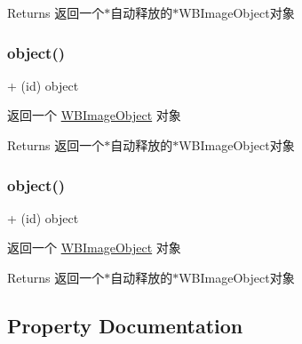 \begin{DoxyReturn}{Returns}
返回一个$\ast$自动释放的$\ast$\+W\+B\+Image\+Object对象 
\end{DoxyReturn}
\mbox{\label{interface_w_b_image_object_abbfcbcca8af541d7f42fe670df3507cc}} 
\subsubsection{\texorpdfstring{object()}{object()}\hspace{0.1cm}{\footnotesize\ttfamily [2/3]}}
{\footnotesize\ttfamily + (id) object \begin{DoxyParamCaption}{ }\end{DoxyParamCaption}}

返回一个 \mbox{\hyperlink{interface_w_b_image_object}{W\+B\+Image\+Object}} 对象

\begin{DoxyReturn}{Returns}
返回一个$\ast$自动释放的$\ast$\+W\+B\+Image\+Object对象 
\end{DoxyReturn}
\mbox{\label{interface_w_b_image_object_abbfcbcca8af541d7f42fe670df3507cc}} 
\subsubsection{\texorpdfstring{object()}{object()}\hspace{0.1cm}{\footnotesize\ttfamily [3/3]}}
{\footnotesize\ttfamily + (id) object \begin{DoxyParamCaption}{ }\end{DoxyParamCaption}}

返回一个 \mbox{\hyperlink{interface_w_b_image_object}{W\+B\+Image\+Object}} 对象

\begin{DoxyReturn}{Returns}
返回一个$\ast$自动释放的$\ast$\+W\+B\+Image\+Object对象 
\end{DoxyReturn}


\subsection{Property Documentation}
\mbox{\label{interface_w_b_image_object_a9eda5041875f4bce31255b301a56668a}} 
